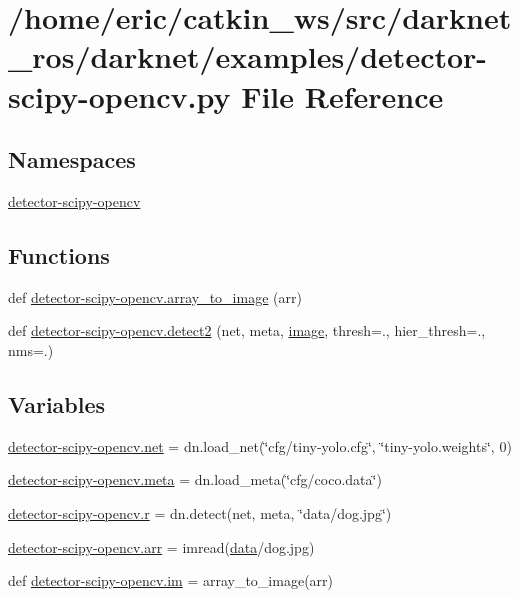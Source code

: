 \hypertarget{detector-scipy-opencv_8py}{}\section{/home/eric/catkin\+\_\+ws/src/darknet\+\_\+ros/darknet/examples/detector-\/scipy-\/opencv.py File Reference}
\label{detector-scipy-opencv_8py}
\subsection*{Namespaces}
\begin{DoxyCompactItemize}
\item 
 \mbox{\hyperlink{namespacedetector-scipy-opencv}{detector-\/scipy-\/opencv}}
\end{DoxyCompactItemize}
\subsection*{Functions}
\begin{DoxyCompactItemize}
\item 
def \mbox{\hyperlink{namespacedetector-scipy-opencv_a21af42bac0599affdd209fb7ad6ace05}{detector-\/scipy-\/opencv.\+array\+\_\+to\+\_\+image}} (arr)
\item 
def \mbox{\hyperlink{namespacedetector-scipy-opencv_a965d0b9c768aaaf2cede0dd9e1148b1d}{detector-\/scipy-\/opencv.\+detect2}} (net, meta, \mbox{\hyperlink{structimage}{image}}, thresh=., hier\+\_\+thresh=., nms=.)
\end{DoxyCompactItemize}
\subsection*{Variables}
\begin{DoxyCompactItemize}
\item 
\mbox{\hyperlink{namespacedetector-scipy-opencv_a5e661955bb33e5ddd0c20e700ef246b1}{detector-\/scipy-\/opencv.\+net}} = dn.\+load\+\_\+net(\char`\"{}cfg/tiny-\/yolo.\+cfg\char`\"{}, \char`\"{}tiny-\/yolo.\+weights\char`\"{}, 0)
\item 
\mbox{\hyperlink{namespacedetector-scipy-opencv_aefa8c13d2324512c8b50817683901197}{detector-\/scipy-\/opencv.\+meta}} = dn.\+load\+\_\+meta(\char`\"{}cfg/coco.\+data\char`\"{})
\item 
\mbox{\hyperlink{namespacedetector-scipy-opencv_a454d4a9590e11c36c21186a87d98a199}{detector-\/scipy-\/opencv.\+r}} = dn.\+detect(net, meta, \char`\"{}data/dog.\+jpg\char`\"{})
\item 
\mbox{\hyperlink{namespacedetector-scipy-opencv_a0472a36e7499b02302910f8ab212facb}{detector-\/scipy-\/opencv.\+arr}} = imread(\textquotesingle{}\mbox{\hyperlink{structdata}{data}}/dog.\+jpg\textquotesingle{})
\item 
def \mbox{\hyperlink{namespacedetector-scipy-opencv_a5f732f155542b878160190ca2240d4db}{detector-\/scipy-\/opencv.\+im}} = array\+\_\+to\+\_\+image(arr)
\end{DoxyCompactItemize}
